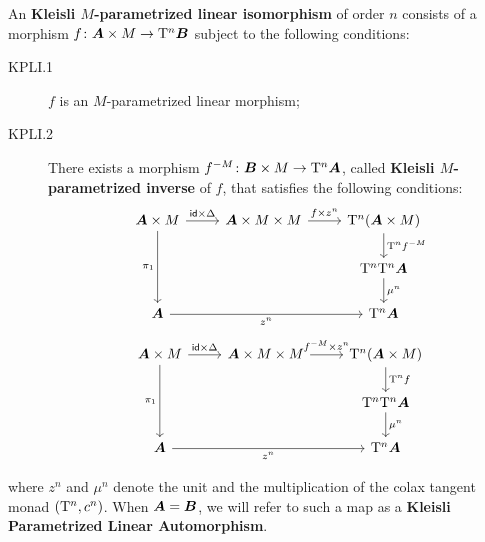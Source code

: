 \begin{definition}
\label{definition:kleisli-PLAs}
An \textbf{Kleisli $M$-parametrized linear isomorphism} of order $n$ consists of a morphism $f\colon{\bm{A}}\times M\to\mathrm{T}^n{\bm{B}}$ subject to the following conditions:
\begin{description}
\item[KPLI.1] $f$ is an $M$-parametrized linear morphism;

\item[KPLI.2] There exists a morphism $f^{-M}\colon{\bm{B}}\times M\to\mathrm{T}^n{\bm{A}}$, called \textbf{Kleisli $M$-parametrized inverse} of $f$, that satisfies the following conditions:
\begin{equation*}
\begin{tikzcd}
{\A\times M} & {\A\times M\times M} & {\T^n(\A\times M)} \\
&& {\T^n\T^n\A} \\
\A && {\T^n\A}
\arrow["{\id\times\Delta}", from=1-1, to=1-2]
\arrow["{\pi_1}"', from=1-1, to=3-1]
\arrow["{f\times z^n}", from=1-2, to=1-3]
\arrow["{\T^nf^{-M}}", from=1-3, to=2-3]
\arrow["{\mu^n}", from=2-3, to=3-3]
\arrow["{z^n}"', from=3-1, to=3-3]
\end{tikzcd}
\end{equation*}
\begin{equation*}
\begin{tikzcd}
{\A\times M} & {\A\times M\times M} & {\T^n(\A\times M)} \\
&& {\T^n\T^n\A} \\
\A && {\T^n\A}
\arrow["{\id\times\Delta}", from=1-1, to=1-2]
\arrow["{\pi_1}"', from=1-1, to=3-1]
\arrow["{f^{-M}\times z^n}", from=1-2, to=1-3]
\arrow["{\T^nf}", from=1-3, to=2-3]
\arrow["{\mu^n}", from=2-3, to=3-3]
\arrow["{z^n}"', from=3-1, to=3-3]
\end{tikzcd}
\end{equation*}
\end{description}
where $z^n$ and $\mu^n$ denote the unit and the multiplication of the colax tangent monad $(\mathrm{T}^n,c^n)$. When ${\bm{A}}={\bm{B}}$, we will refer to such a map as a \textbf{Kleisli Parametrized Linear Automorphism}.
\end{definition}

